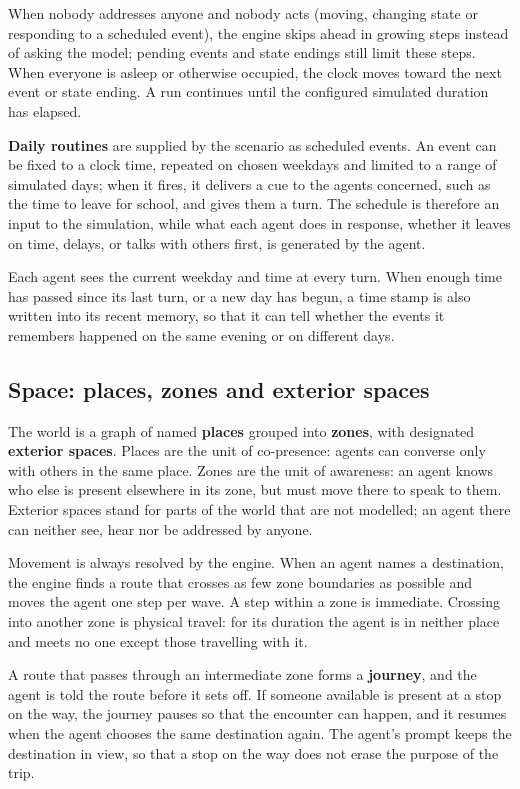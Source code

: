When nobody addresses anyone and nobody acts (moving, changing state or responding to a scheduled event), the engine skips ahead in growing steps instead of asking the model; pending events and state endings still limit these steps. When everyone is asleep or otherwise occupied, the clock moves toward the next event or state ending. A run continues until the configured simulated duration has elapsed.

\textbf{Daily routines} are supplied by the scenario as scheduled events. An event can be fixed to a clock time, repeated on chosen weekdays and limited to a range of simulated days; when it fires, it delivers a cue to the agents concerned, such as the time to leave for school, and gives them a turn. The schedule is therefore an input to the simulation, while what each agent does in response, whether it leaves on time, delays, or talks with others first, is generated by the agent.

Each agent sees the current weekday and time at every turn. When enough time has passed since its last turn, or a new day has begun, a time stamp is also written into its recent memory, so that it can tell whether the events it remembers happened on the same evening or on different days.

\subsection{Space: places, zones and exterior spaces}
\label{sec:methods:space}

The world is a graph of named \textbf{places} grouped into \textbf{zones}, with designated \textbf{exterior spaces}. Places are the unit of co-presence: agents can converse only with others in the same place. Zones are the unit of awareness: an agent knows who else is present elsewhere in its zone, but must move there to speak to them. Exterior spaces stand for parts of the world that are not modelled; an agent there can neither see, hear nor be addressed by anyone.

Movement is always resolved by the engine. When an agent names a destination, the engine finds a route that crosses as few zone boundaries as possible and moves the agent one step per wave. A step within a zone is immediate. Crossing into another zone is physical travel: for its duration the agent is in neither place and meets no one except those travelling with it.

A route that passes through an intermediate zone forms a \textbf{journey}, and the agent is told the route before it sets off. If someone available is present at a stop on the way, the journey pauses so that the encounter can happen, and it resumes when the agent chooses the same destination again. The agent's prompt keeps the destination in view, so that a stop on the way does not erase the purpose of the trip.

